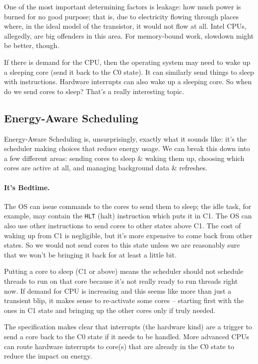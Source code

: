 One of the most important determining factors is leakage: how much power is burned for no good purpose; that is, due to electricity flowing through places where, in the ideal model of the transistor, it would not flow at all. Intel CPUs, allegedly, are big offenders in this area. For memory-bound work, slowdown might be better, though.

If there is demand for the CPU, then the operating system may need to wake up a sleeping core (send it back to the C0 state). It can similarly send things to sleep with instructions. Hardware interrupts can also wake up a sleeping core. So when do we send cores to sleep? That's a really interesting topic.

\subsection*{Energy-Aware Scheduling}

Energy-Aware Scheduling is, unsurprisingly, exactly what it sounds like: it's the scheduler making choices that reduce energy usage. We can break this down into a few different areas: sending cores to sleep \& waking them up, choosing which cores are active at all, and managing background data \& refreshes.

\paragraph{It's Bedtime.} The OS can issue commands to the cores to send them to sleep; the idle task, for example, may contain the \texttt{HLT} (halt) instruction which puts it in C1. The OS can also use other instructions to send cores to other states above C1. The cost of waking up from C1 is negligible, but it's more expensive to come back from other states. So we would not send cores to this state unless we are reasonably sure that we won't be bringing it back for at least a little bit. 

Putting a core to sleep (C1 or above) means the scheduler should not schedule threads to run on that core because it's not really ready to run threads right now. If demand for CPU is increasing and this seems like more than just a transient blip, it makes sense to re-activate some cores -- starting first with the ones in C1 state and bringing up the other cores only if truly needed.

The specification makes clear that interrupts (the hardware kind) are a trigger to send a core back to the C0 state if it needs to be handled. More advanced CPUs can route hardware interrupts to core(s) that are already in the C0 state to reduce the impact on energy.

